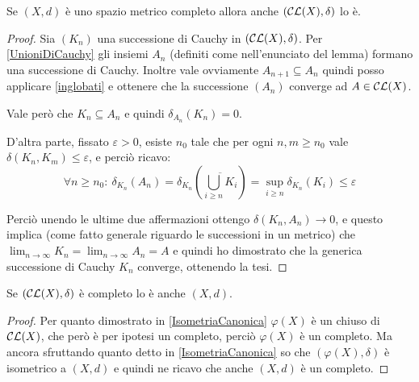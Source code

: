 \begin{theorem} \label{CompletezzaCL}
	Se $(X,d)$ è uno spazio metrico completo allora anche $(\mathcal{CL}(X),\delta)$ lo è.
\end{theorem}
\begin{proof}
	Sia $(K_n)$ una successione di Cauchy in $(\mathcal{CL}(X),\delta)$.
	Per \cref{UnioniDiCauchy} gli insiemi $A_n$ (definiti come nell'enunciato del lemma) formano una successione di Cauchy.
	Inoltre vale ovviamente $A_{n+1}\subseteq A_n$ quindi posso applicare \cref{inglobati} e ottenere che la successione $(A_n)$ converge ad $A\in\mathcal{CL}(X)$.
	
	Vale però che $K_n\subseteq A_n$ e quindi $\delta_{A_n}(K_n)=0$.
	
	D'altra parte, fissato $\varepsilon > 0$, esiste $n_0$ tale che per ogni $n,m\ge n_0$ vale $\delta(K_n,K_m)\le \varepsilon$, e perciò ricavo:
	\begin{equation*}
		\forall n\ge n_0:\ \delta_{K_n}(A_n)=\delta_{K_n}\left(\overline{\bigcup_{i\ge n} K_i}\right)
		=\sup_{i\ge n}\delta_{K_n}(K_i)\le \varepsilon
	\end{equation*}
	
	Perciò unendo le ultime due affermazioni ottengo $\delta(K_n,A_n)\to 0$, e questo implica (come fatto generale riguardo le successioni in un metrico) che $\lim_{n\to\infty}K_n=\lim_{n\to\infty}A_n=A$ e quindi ho dimostrato che la generica successione di Cauchy $K_n$ converge, ottenendo la tesi.
\end{proof}

\begin{remark}\label{CompletezzaInverso}
Se $\left (\mathcal{CL}(X),\delta \right ) $ è completo lo è anche $(X,d)$.
\end{remark}
\begin{proof}
Per quanto dimostrato in \cref{IsometriaCanonica} $\varphi(X)$ è un chiuso di $\mathcal{CL}(X)$, che però è per ipotesi un completo, perciò $\varphi(X)$ è un completo. Ma ancora sfruttando quanto detto in \cref{IsometriaCanonica} so che $(\varphi(X),\delta)$ è isometrico a $(X,d)$ e quindi ne ricavo che anche $(X,d)$ è un completo.
\end{proof}
